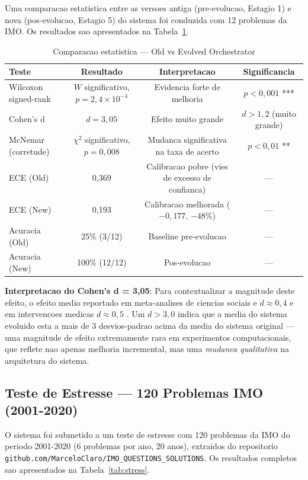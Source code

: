 \documentclass[5p]{elsarticle}
\begin{document}
Uma comparacao estatistica entre as versoes antiga (pre-evolucao, Estagio 1)
e nova (pos-evolucao, Estagio 5) do sistema foi conduzida com 12 problemas da
IMO. Os resultados sao apresentados na Tabela~\ref{tab:stats}.

\begin{table}[H]
  \centering
  \caption{Comparacao estatistica — Old vs Evolved Orchestrator}
  \label{tab:stats}
  \small
  \begin{tabular}{lccc}
    \toprule
    \textbf{Teste} & \textbf{Resultado} & \textbf{Interpretacao} & \textbf{Significancia} \\
    \midrule
    Wilcoxon signed-rank & $W$ significativo, $p = 2,4 \times 10^{-4}$ & Evidencia forte de melhoria & $p < 0,001$ *** \\
    Cohen's d & $d = 3,05$ & Efeito muito grande & $d > 1,2$ (muito grande) \\
    McNemar (corretude) & $\chi^2$ significativo, $p = 0,008$ & Mudanca significativa na taxa de acerto & $p < 0,01$ ** \\
    ECE (Old) & 0,369 & Calibracao pobre (vies de excesso de confianca) & --- \\
    ECE (New) & 0,193 & Calibracao melhorada ($-0,177$, $-48\%$) & --- \\
    Acuracia (Old) & 25\% (3/12) & Baseline pre-evolucao & --- \\
    Acuracia (New) & 100\% (12/12) & Pos-evolucao & --- \\
    \bottomrule
  \end{tabular}
\end{table}

\textbf{Interpretacao do Cohen's d = 3,05}: Para contextualizar a magnitude
deste efeito, o efeito medio reportado em meta-analises de ciencias sociais
e $d \approx 0,4$ e em intervencoes medicas $d \approx 0,5$ \cite{cohen1988}.
Um $d > 3,0$ indica que a media do sistema evoluido esta a mais de 3
desvios-padrao acima da media do sistema original --- uma magnitude de efeito
extremamente rara em experimentos computacionais, que reflete nao apenas
melhoria incremental, mas uma \textit{mudanca qualitativa} na arquitetura
do sistema.

\subsection{Teste de Estresse — 120 Problemas IMO (2001-2020)}

O sistema foi submetido a um teste de estresse com 120 problemas da IMO do
periodo 2001-2020 (6 problemas por ano, 20 anos), extraidos do repositorio
\texttt{github.com/MarceloClaro/IMO\_QUESTIONS\_SOLUTIONS}. Os resultados
completos sao apresentados na Tabela~\ref{tab:stress}.
\end{document}
